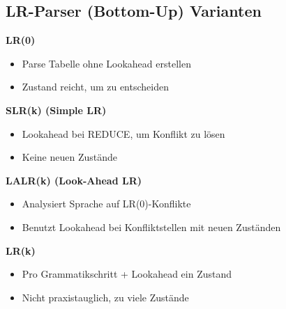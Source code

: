 \subsection{LR-Parser (Bottom-Up) Varianten}
\textbf{LR(0)}
\begin{itemize}
    \item Parse Tabelle ohne Lookahead erstellen
    \item Zustand reicht, um zu entscheiden
\end{itemize}
\textbf{SLR(k) (Simple LR)}
\begin{itemize}
    \item Lookahead bei REDUCE, um Konflikt zu lösen
    \item Keine neuen Zustände
\end{itemize}
\textbf{LALR(k) (Look-Ahead LR)}
\begin{itemize}
    \item Analysiert Sprache auf LR(0)-Konflikte
    \item Benutzt Lookahead bei Konfliktstellen mit neuen Zuständen
\end{itemize}
\textbf{LR(k)}
\begin{itemize}
    \item Pro Grammatikschritt + Lookahead ein Zustand
    \item Nicht praxistauglich, zu viele Zustände
\end{itemize}